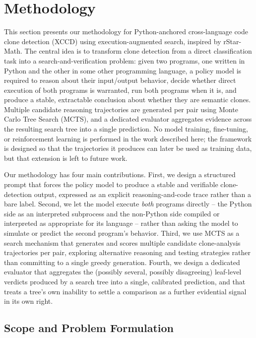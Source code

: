 \section{Methodology}
\label{sec:methodology}

This section presents our methodology for Python-anchored cross-language code
clone detection (XCCD) using execution-augmented search, inspired by
rStar-Math. The central idea is to transform clone detection from a direct
classification task into a search-and-verification problem: given two
programs, one written in Python and the other in some other programming
language, a policy model is required to reason about their input/output
behavior, decide whether direct execution of both programs is warranted, run
both programs when it is, and produce a stable, extractable conclusion about
whether they are semantic clones. Multiple candidate reasoning trajectories
are generated per pair using Monte Carlo Tree Search (MCTS), and a dedicated
evaluator aggregates evidence across the resulting search tree into a single
prediction. No model training, fine-tuning, or reinforcement learning is
performed in the work described here; the framework is designed so that the
trajectories it produces can later be used as training data, but that
extension is left to future work.

Our methodology has four main contributions. First, we design a structured
prompt that forces the policy model to produce a stable and verifiable
clone-detection output, expressed as an explicit reasoning-and-code trace
rather than a bare label. Second, we let the model execute \emph{both}
programs directly -- the Python side as an interpreted subprocess and the
non-Python side compiled or interpreted as appropriate for its language --
rather than asking the model to simulate or predict the second program's
behavior. Third, we use MCTS as a search mechanism that generates and scores
multiple candidate clone-analysis trajectories per pair, exploring alternative
reasoning and testing strategies rather than committing to a single greedy
generation. Fourth, we design a dedicated evaluator that aggregates the
(possibly several, possibly disagreeing) leaf-level verdicts produced by a
search tree into a single, calibrated prediction, and that treats a tree's own
inability to settle a comparison as a further evidential signal in its own
right.

\subsection{Scope and Problem Formulation}
\label{subsec:scope_problem}

